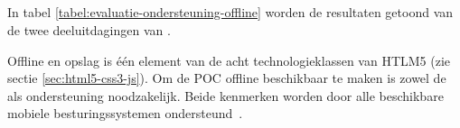 % 
% 
% 
% 


\subsection{}
\label{sec:evaluatie-ondersteuning-offline}

In tabel \ref{tabel:evaluatie-ondersteuning-offline} worden de resultaten getoond van de twee deeluitdagingen van .

Offline en opslag is één element van de acht technologieklassen van HTLM5 (zie sectie \ref{sec:html5-css3-js}).
Om de POC offline beschikbaar te maken is zowel de  als  ondersteuning noodzakelijk.
Beide kenmerken worden door alle beschikbare mobiele besturingssystemen ondersteund~\cite{Deveria2013c}. 



